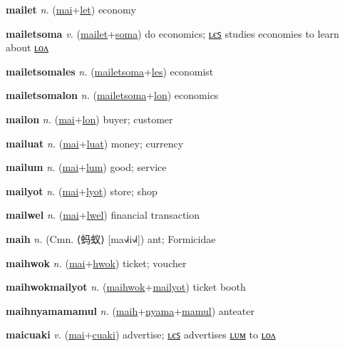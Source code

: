 \textbf{\hypertarget{mailet}{mailet}} \textit{n.} (\hyperlink{mai}{mai}+\allowbreak \hyperlink{let}{let})
economy

\textbf{\hypertarget{mailetsoma}{mailetsoma}} \textit{v.} (\hyperlink{mailet}{mailet}+\allowbreak \hyperlink{soma}{soma})
do economics; \hyperlink{mailetsomales}{ʟєꜱ} studies economies to learn about \hyperlink{mailetsomalon}{ʟᴏᴧ}

\textbf{\hypertarget{mailetsomales}{mailetsomales}} \textit{n.} (\hyperlink{mailetsoma}{mailetsoma}+\allowbreak \hyperlink{les}{les})
economist

\textbf{\hypertarget{mailetsomalon}{mailetsomalon}} \textit{n.} (\hyperlink{mailetsoma}{mailetsoma}+\allowbreak \hyperlink{lon}{lon})
economics

\textbf{\hypertarget{mailon}{mailon}} \textit{n.} (\hyperlink{mai}{mai}+\allowbreak \hyperlink{lon}{lon})
buyer; customer

\textbf{\hypertarget{mailuat}{mailuat}} \textit{n.} (\hyperlink{mai}{mai}+\allowbreak \hyperlink{luat}{luat})
money; currency

\textbf{\hypertarget{mailum}{mailum}} \textit{n.} (\hyperlink{mai}{mai}+\allowbreak \hyperlink{lum}{lum})
good; service

\textbf{\hypertarget{mailyot}{mailyot}} \textit{n.} (\hyperlink{mai}{mai}+\allowbreak \hyperlink{lyot}{lyot})
store; shop

\textbf{\hypertarget{mailwel}{mailwel}} \textit{n.} (\hyperlink{mai}{mai}+\allowbreak \hyperlink{lwel}{lwel})
financial transaction

\textbf{\hypertarget{maih}{maih}} \textit{n.} (Cmn. ⟨{\chinese{}蚂蚁}⟩ [ma˧˩˧i˧˩˧])
ant; Formicidae

\textbf{\hypertarget{maihwok}{maihwok}} \textit{n.} (\hyperlink{mai}{mai}+\allowbreak \hyperlink{hwok}{hwok})
ticket; voucher

\textbf{\hypertarget{maihwokmailyot}{maihwokmailyot}} \textit{n.} (\hyperlink{maihwok}{maihwok}+\allowbreak \hyperlink{mailyot}{mailyot})
ticket booth

\textbf{\hypertarget{maihnyamamamul}{maihnyamamamul}} \textit{n.} (\hyperlink{maih}{maih}+\allowbreak \hyperlink{nyama}{nyama}+\allowbreak \hyperlink{mamul}{mamul})
anteater

\textbf{\hypertarget{maicuaki}{maicuaki}} \textit{v.} (\hyperlink{mai}{mai}+\allowbreak \hyperlink{cuaki}{cuaki})
advertise; \hyperlink{maicuakiles}{ʟєꜱ} advertises \hyperlink{maicuakilum}{ʟᴜᴍ} to \hyperlink{maicuakilon}{ʟᴏᴧ}

